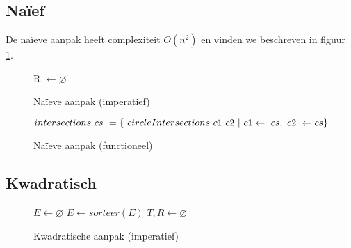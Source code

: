 


\subsection{Na\"ief}
\label{sec:naief}

De naïeve aanpak heeft complexiteit $O(n^2)$ en vinden we beschreven in
figuur \ref{algo:naive}. 

\begin{figure}[H]
  \begin{algorithm}[H]
    R $\leftarrow \varnothing$\;
    \caption{Na\"ieve aanpak (imperatief)}
  \end{algorithm}
  \label{algo:naive}
\end{figure}

\begin{figure}[H]
\[
intersections\ cs\ = \{\ circleIntersections\ c1\ c2\ |\ c1 \leftarrow\ cs,\ c2\ \leftarrow\\ cs \}
\]
\label{naief_functioneel}
\caption{Na\"ieve aanpak (functioneel)}
\end{figure}




\subsection{Kwadratisch}
\label{sec:kwadratisch}

\begin{figure}[H]
  \begin{algorithm}[H]
    $E \leftarrow \varnothing$\;
    $E \leftarrow sorteer(E)$\;
    $T, R \leftarrow \varnothing$\;
    \caption{Kwadratische aanpak (imperatief)}
  \end{algorithm}
\end{figure}

